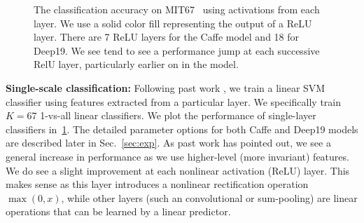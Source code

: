 \documentclass[10pt,twocolumn,letterpaper]{article}
\begin{document}
\begin{figure}[htbp]
\centering
\caption{The classification accuracy on MIT67~\cite{MIT67} using activations from each layer. We use a solid color fill representing the output of a ReLU layer. There are 7 ReLU layers for the Caffe model and 18 for Deep19. We see tend to see a performance jump at each successive RelU layer, particularly earlier on in the model.}
\label{fig:layer_MIT67}
\end{figure}

{\bf Single-scale classification:} Following past work \cite{cnn_baseline}, we train a linear SVM classifier using features extracted from a particular layer. We specifically train $K=67$ 1-vs-all linear classifiers.
We plot the performance of single-layer classifiers in~\ref{fig:layer_MIT67}. The detailed parameter options for both Caffe and Deep19 models are described later in Sec.~\ref{sec:exp}. As past work has pointed out, we see a general increase in performance as we use higher-level (more invariant) features. We do see a slight improvement at each nonlinear activation (ReLU) layer. This makes sense as this layer introduces a nonlinear rectification operation $\max(0,x)$, while other layers (such an convolutional or sum-pooling) are linear operations that can be learned by a linear predictor.
\end{document}
